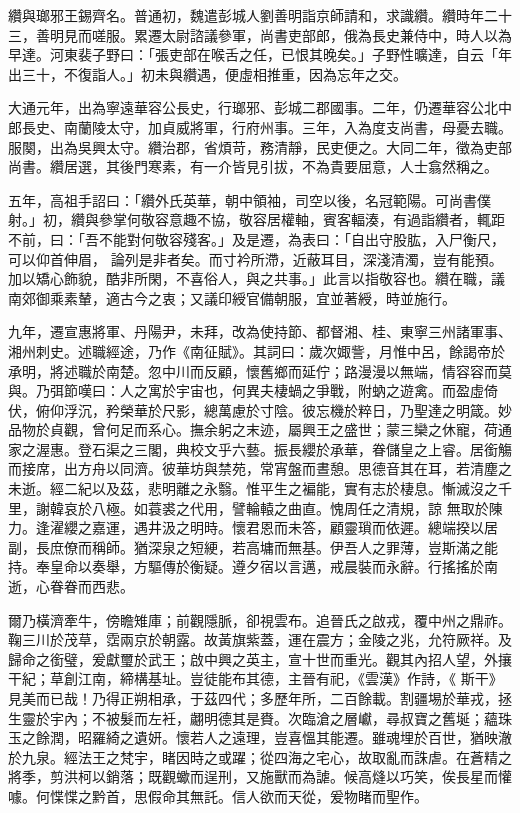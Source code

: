 \begin{pinyinscope}
 纘與瑯邪王錫齊名。普通初，魏遣彭城人劉善明詣京師請和，求識纘。纘時年二十三，善明見而嗟服。累遷太尉諮議參軍，尚書吏部郎，俄為長史兼侍中，時人以為早達。河東裴子野曰：「張吏部在喉舌之任，已恨其晚矣。」子野性曠達，自云「年出三十，不復詣人。」初未與纘遇，便虛相推重，因為忘年之交。



 大通元年，出為寧遠華容公長史，行瑯邪、彭城二郡國事。二年，仍遷華容公北中郎長史、南蘭陵太守，加貞威將軍，行府州事。三年，入為度支尚書，母憂去職。服闋，出為吳興太守。纘治郡，省煩苛，務清靜，民吏便之。大同二年，徵為吏部尚書。纘居選，其後門寒素，有一介皆見引拔，不為貴要屈意，人士翕然稱之。



 五年，高祖手詔曰：「纘外氏英華，朝中領袖，司空以後，名冠範陽。可尚書僕射。」初，纘與參掌何敬容意趣不協，敬容居權軸，賓客輻湊，有過詣纘者，輒距不前，曰：「吾不能對何敬容殘客。」及是遷，為表曰：「自出守股肱，入尸衡尺，可以仰首伸眉，
 論列是非者矣。而寸衿所滯，近蔽耳目，深淺清濁，豈有能預。加以矯心飾貌，酷非所閑，不喜俗人，與之共事。」此言以指敬容也。纘在職，議南郊御乘素輦，適古今之衷；又議印綬官備朝服，宜並著綬，時並施行。



 九年，遷宣惠將軍、丹陽尹，未拜，改為使持節、都督湘、桂、東寧三州諸軍事、湘州刺史。述職經途，乃作《南征賦》。其詞曰：歲次娵訾，月惟中呂，餘謁帝於承明，將述職於南楚。忽中川而反顧，懷舊鄉而延佇；路漫漫以無端，情容容而莫與。乃弭節嘆曰：人之寓於宇宙也，何異夫棲蝸之爭戰，附蚋之遊禽。而盈虛倚伏，俯仰浮沉，矜榮華於尺影，總萬慮於寸陰。彼忘機於粹日，乃聖達之明箴。妙品物於貞觀，曾何足而系心。撫余躬之末迹，屬興王之盛世；蒙三欒之休寵，荷通家之渥惠。登石渠之三閣，典校文乎六藝。振長纓於承華，眷儲皇之上睿。居銜觴而接席，出方舟以同濟。彼華坊與禁苑，常宵盤而晝憩。思德音其在耳，若清塵之未逝。經二紀以及茲，悲明離之永翳。惟平生之褊能，實有志於棲息。慚滅沒之千里，謝韓哀於八極。如蓑裘之代用，譬輪轅之曲直。愧周任之清規，諒
 無取於陳力。逢濯纓之嘉運，遇井汲之明時。懷君恩而未答，顧靈瑣而依遲。總端揆以居副，長庶僚而稱師。猶深泉之短綆，若高墉而無基。伊吾人之罪薄，豈斯滿之能持。奉皇命以奏舉，方驅傳於衡疑。遵夕宿以言邁，戒晨裝而永辭。行搖搖於南逝，心眷眷而西悲。



 爾乃橫濟牽牛，傍瞻雉庫；前觀隱脈，卻視雲布。追晉氏之啟戎，覆中州之鼎祚。鞠三川於茂草，霑兩京於朝露。故黃旗紫蓋，運在震方；金陵之兆，允符厥祥。及歸命之銜璧，爰獻璽於武王；啟中興之英主，宣十世而重光。觀其內招人望，外攘干紀；草創江南，締構基址。豈徒能布其德，主晉有祀，《雲漢》作詩，《
 斯干》見美而已哉！乃得正朔相承，于茲四代；多歷年所，二百餘載。割疆埸於華戎，拯生靈於宇內；不被髮而左衽，翽明德其是賚。次臨滄之層巘，尋叔寶之舊埏；蘊珠玉之餘潤，昭羅綺之遺妍。懷若人之遠理，豈喜慍其能遷。雖魂埋於百世，猶映澈於九泉。經法王之梵宇，睹因時之或躍；從四海之宅心，故取亂而誅虐。在蒼精之將季，剪洪柯以銷落；既觀蠍而逞刑，又施獸而為謔。候高熢以巧笑，俟長星而懽噱。何惵惵之黔首，思假命其無託。信人欲而天從，爰物睹而聖作。




\end{pinyinscope}
